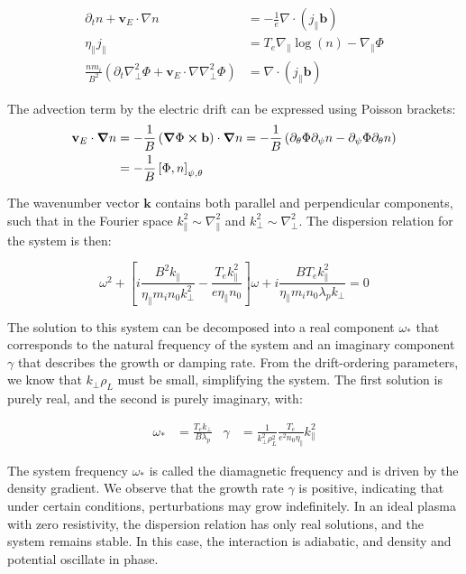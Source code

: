 \begin{align}
	\partial_t n + \mathbf{v}_E \cdot \nabla n &= -\frac{1}{e} \nabla \cdot (j_\parallel \mathbf{b}) \\
	\eta_\parallel j_\parallel &= T_e \nabla_\parallel \log(n) - \nabla_\parallel \Phi \\
	\frac{nm_i}{B^2} \left(\partial_t \nabla_\perp^2 \Phi + \mathbf{v}_E \cdot \nabla \nabla_\perp^2 \Phi\right) &= \nabla \cdot (j_\parallel \mathbf{b})
\end{align}

The advection term by the electric drift can be expressed using Poisson brackets:
\begin{align}
	\mathbf{v}_E\cdot\grad n &= -\frac{1}{B}\left(\grad\Phi\cross \mathbf{b} \right)\cdot\grad n = -\frac{1}{B} \left(\partial_\theta\Phi \partial_\psi n - \partial_\psi\Phi \partial_\theta n\right) \nonumber \\ 
	&= -\frac{1}{B}\left[\Phi,n\right]_{\psi,\theta} \label{eq:edge_poissonBracket}
\end{align}

The wavenumber vector $ \mathbf{k} $ contains both parallel and perpendicular components, such that in the Fourier space $ k_\parallel^2 \sim \nabla_\parallel^2 $ and $ k_\perp^2 \sim \nabla_\perp^2 $. The dispersion relation for the system is then:


\begin{equation}
	\omega^2 + \left[i\frac{B^2k_\parallel}{\eta_\parallel m_i n_0 k_\perp^2} - \frac{T_ek_\parallel^2}{e\eta_\parallel n_0}\right]\omega + i\frac{BT_ek_\parallel^2}{\eta_\parallel m_i n_0 \lambda_p k_\perp} = 0
\end{equation}


The solution to this system can be decomposed into a real component $ \omega_* $ that corresponds to the natural frequency of the system and an imaginary component $ \gamma $ that describes the growth or damping rate. From the drift-ordering parameters, we know that $ k_\perp \rho_L $ must be small, simplifying the system. The first solution is purely real, and the second is purely imaginary, with:

\begin{align}
	\omega_* &= \frac{T_e k_\perp}{B\lambda_p} & \gamma &= \frac{1}{k_\perp^2 \rho_L^2}\frac{T_e}{e^2 n_0 \eta_\parallel} k_\parallel^2
\end{align}

The system frequency $ \omega_* $ is called the diamagnetic frequency and is driven by the density gradient. We observe that the growth rate $ \gamma $ is positive, indicating that under certain conditions, perturbations may grow indefinitely. In an ideal plasma with zero resistivity, the dispersion relation has only real solutions, and the system remains stable. In this case, the interaction is adiabatic, and density and potential oscillate in phase.


